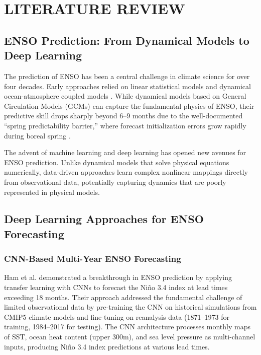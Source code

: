 \chapter{LITERATURE REVIEW}

\section{ENSO Prediction: From Dynamical Models to Deep Learning}

The prediction of ENSO has been a central challenge in climate science for over four decades. Early approaches relied on linear statistical models and dynamical ocean-atmosphere coupled models \cite{dijkstra2019deep}. While dynamical models based on General Circulation Models (GCMs) can capture the fundamental physics of ENSO, their predictive skill drops sharply beyond 6--9 months due to the well-documented ``spring predictability barrier,'' where forecast initialization errors grow rapidly during boreal spring \cite{mahesh2024physics}.

The advent of machine learning and deep learning has opened new avenues for ENSO prediction. Unlike dynamical models that solve physical equations numerically, data-driven approaches learn complex nonlinear mappings directly from observational data, potentially capturing dynamics that are poorly represented in physical models.

\section{Deep Learning Approaches for ENSO Forecasting}

\subsection{CNN-Based Multi-Year ENSO Forecasting}

Ham et al. \cite{ham2019deep} demonstrated a breakthrough in ENSO prediction by applying transfer learning with CNNs to forecast the Ni\~{n}o 3.4 index at lead times exceeding 18 months. Their approach addressed the fundamental challenge of limited observational data by pre-training the CNN on historical simulations from CMIP5 climate models and fine-tuning on reanalysis data (1871--1973 for training, 1984--2017 for testing). The CNN architecture processes monthly maps of SST, ocean heat content (upper 300m), and sea level pressure as multi-channel inputs, producing Ni\~{n}o 3.4 index predictions at various lead times.

